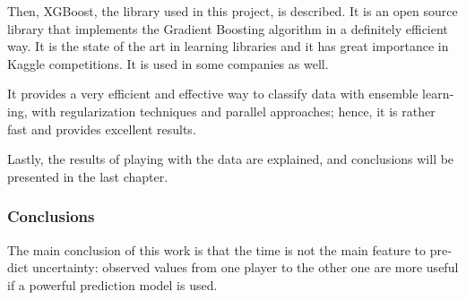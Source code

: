 \begin{otherlanguage}{british}
Then, XGBoost, the library used in this project, is described. It is an open
source library that implements the Gradient Boosting algorithm in a definitely
efficient way. It is the state of the art in learning libraries and it has great
importance in Kaggle competitions. It is used in some companies as well.

It provides a very efficient and effective way to classify data with ensemble
learning, with regularization techniques and parallel approaches; hence,
it is rather fast and provides excellent results.

Lastly, the results of playing with the data are explained, and conclusions
will be presented in the last chapter.

\subsubsection*{Conclusions}

The main conclusion of this work is that the time is not the main feature to
predict uncertainty: observed values from one player to the other one are
more useful if a powerful prediction model is used.




\end{otherlanguage}
